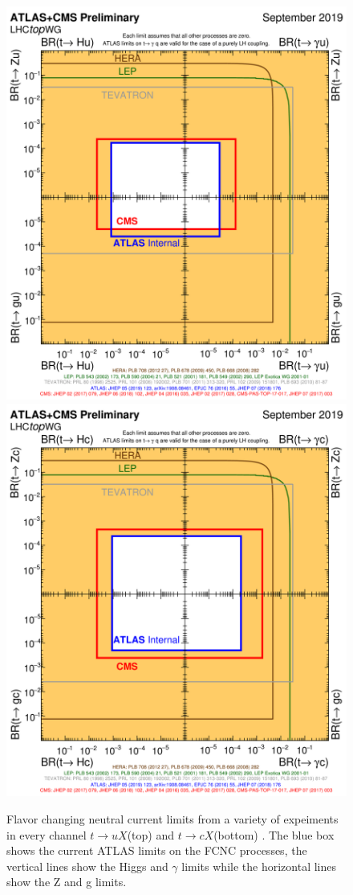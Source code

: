 \begin{figure}[h!]
	\centering
	\includegraphics[width=.5\columnwidth]{../ThesisImages/Theory/fcnc_tXu_sep18.png}
	\includegraphics[width=.5\columnwidth]{../ThesisImages/Theory/fcnc_tXc_sep18.png}
	\caption[Flavor changing neutral current limits from a variety of expeiments in every channel $t\rightarrow uX$(top) and $t\rightarrow cX$(bottom).]{Flavor changing neutral current limits from a variety of expeiments in every channel $t\rightarrow uX$(top) and $t\rightarrow cX$(bottom) \cite{TopWG}.  The blue box shows the current ATLAS limits on the FCNC processes, the vertical lines show the Higgs and $\gamma$ limits while the horizontal lines show the Z and g limits.}
	\label{fig:FCNCLimsBox}
\end{figure}

